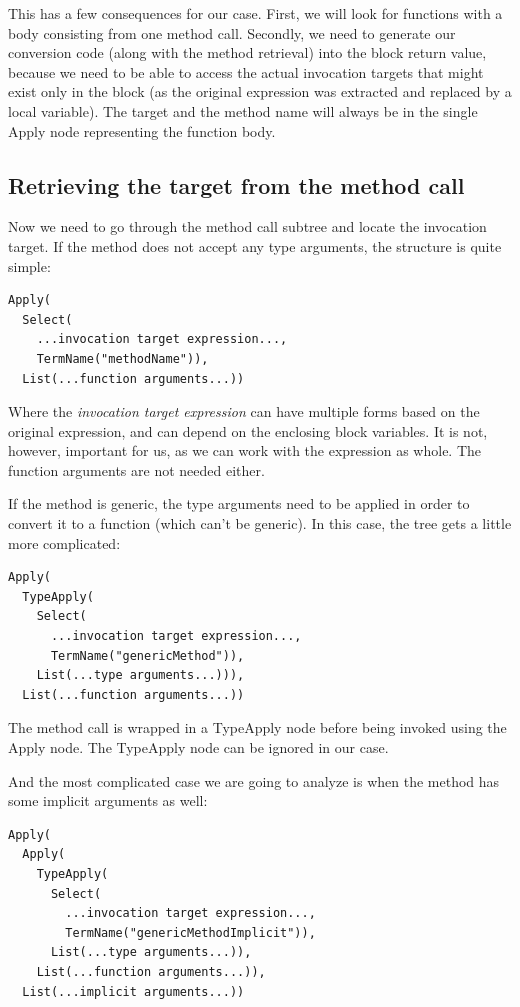 This has a few consequences for our case. First, we will look for functions with a body consisting from one method call. Secondly, we need to generate our conversion code (along with the method retrieval) into the block return value, because we need to be able to access the actual invocation targets that might exist only in the block (as the original expression was extracted and replaced by a local variable). The target and the method name will always be in the single Apply node representing the function body.

\subsection{Retrieving the target from the method call}

Now we need to go through the method call subtree and locate the invocation target. If the method does not accept any type arguments, the structure is quite simple:

\lstset{style=Dump}
\begin{lstlisting}
Apply(
  Select(
    ...invocation target expression..., 
    TermName("methodName")), 
  List(...function arguments...))
\end{lstlisting}

Where the \textit{invocation target expression} can have multiple forms based on the original expression, and can depend on the enclosing block variables. It is not, however, important for us, as we can work with the expression as whole. The function arguments are not needed either.

If the method is generic, the type arguments need to be applied in order to convert it to a function (which can't be generic). In this case, the tree gets a little more complicated:

\lstset{style=Dump}
\begin{lstlisting}
Apply(
  TypeApply(
    Select(
      ...invocation target expression..., 
      TermName("genericMethod")), 
    List(...type arguments...))), 
  List(...function arguments...))
\end{lstlisting}

The method call is wrapped in a TypeApply node before being invoked using the Apply node. The TypeApply node can be ignored in our case.

And the most complicated case we are going to analyze is when the method has some implicit arguments as well:

\lstset{style=Dump}
\begin{lstlisting}
Apply(
  Apply(
    TypeApply(
      Select(
        ...invocation target expression...,
        TermName("genericMethodImplicit")), 
      List(...type arguments...)), 
    List(...function arguments...)), 
  List(...implicit arguments...))
\end{lstlisting}

